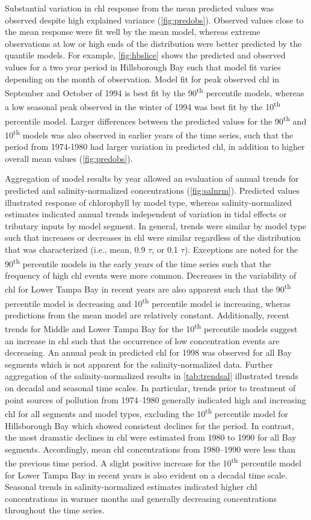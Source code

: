 \documentclass{svjour3}\usepackage[]{graphicx}\usepackage[]{color}
\newcommand{\nine}{90\textsuperscript{th} percentile }
\newcommand{\ten}{10\textsuperscript{th} percentile }
\begin{document}
Substantial variation in \ac{chl} response from the mean predicted values was observed despite high explained variance (\cref{fig:predobs}).  Observed values close to the mean response were fit well by the mean model, whereas extreme observations at low or high ends of the distribution were better predicted by the quantile models. For example, \cref{fig:hbslice} shows the predicted and observed values for a two year period in Hillsborough Bay such that model fit varies depending on the month of observation.  Model fit for peak observed \ac{chl} in September and October of 1994 is best fit by the \nine models, whereas a low seasonal peak observed in the winter of 1994 was best fit by the \ten model.  Larger differences between the predicted values for the 90\textsuperscript{th} and 10\textsuperscript{th} models was also observed in earlier years of the time series, such that the period from 1974-1980 had larger variation in predicted \ac{chl}, in addition to higher overall mean values (\cref{fig:predobs}).  

Aggregation of model results by year allowed an evaluation of annual trends for predicted and salinity-normalized concentrations (\cref{fig:salnrm}).  Predicted values illustrated response of chlorophyll by model type, whereas salinity-normalized estimates indicated annual trends independent of variation in tidal effects or tributary inputs by model segment.  In general, trends were similar by model type such that increases or decreases in \ac{chl} were similar regardless of the distribution that was characterized (i.e., mean, 0.9 $\tau$, or 0.1 $\tau$).  Exceptions are noted for the \nine models in the early years of the time series such that the frequency of high \ac{chl} events were more common.  Decreases in the variability of \ac{chl} for Lower Tampa Bay in recent years are also apparent such that the \nine model is decreasing and \ten model is increasing, wheras predictions from the mean model are relatively constant.  Additionally, recent trends for Middle and Lower Tampa Bay for the \ten models suggest an increase in \ac{chl} such that the occurrence of low concentration events are decreasing.  An annual peak in predicted \ac{chl} for 1998 was observed for all Bay segments which is not apparent for the salinity-normalized data. Further aggregation of the salinity-normalized results in \cref{tab:trendsal} illustrated trends on decadal and seasonal time scales.  In particular, trends prior to treatment of point sources of pollution from 1974--1980 generally indicated high and increasing \ac{chl} for all segments and model types, excluding the \ten model for Hillsborough Bay which showed consistent declines for the period.  In contrast, the most dramatic declines in \ac{chl} were estimated from 1980 to 1990 for all Bay segments.  Accordingly, mean \ac{chl} concentrations from 1980--1990 were less than the previous time period.  A slight positive increase for the \ten model for Lower Tampa Bay in recent years is also evident on a decadal time scale.  Seasonal trends in salinity-normalized estimates indicated higher \ac{chl} concentrations in warmer months and generally decreasing concentrations throughout the time series.
\end{document}
